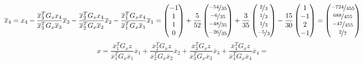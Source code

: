 \documentclass{article}
\begin{document}
$$
    \overline{x}_4 = x_4 - \frac{\overline{x}_3^TG_xx_4}{\overline{x}_3^TG_x\overline{x}_3}\overline{x}_3 - \frac{\overline{x}_2^TG_xx_4}{\overline{x}_2^TG_x\overline{x}_2}\overline{x}_2 - \frac{\overline{x}_1^TG_xx_4}{\overline{x}_1^TG_x\overline{x}_1}\overline{x}_1 = \begin{pmatrix}
        -1 \\ 1 \\ 1 \\ 0
    \end{pmatrix} + \frac{5}{52}\begin{pmatrix}
        \nicefrac{-54}{35} \\ \nicefrac{-6}{35} \\ \nicefrac{-48}{35} \\ \nicefrac{-26}{35}
    \end{pmatrix} + \frac{3}{35}\begin{pmatrix}
        \nicefrac{2}{3} \\ \nicefrac{1}{3} \\ \nicefrac{1}{3} \\ \nicefrac{-5}{3}
    \end{pmatrix} - \frac{15}{30}\begin{pmatrix}
        1 \\ -1 \\ 2 \\ -1
    \end{pmatrix} = \begin{pmatrix}
        \nicefrac{-724}{455} \\ \nicefrac{688}{455} \\ \nicefrac{-47}{455} \\ \nicefrac{2}{7}
    \end{pmatrix}
$$
$$x = \frac{\overline{x}_1^TG_xz}{\overline{x}_1^TG_x\overline{x}_1}\overline{x}_1 + \frac{\overline{x}_2^TG_xz}{\overline{x}_2^TG_x\overline{x}_2}\overline{x}_2 + \frac{\overline{x}_3^TG_xz}{\overline{x}_3^TG_x\overline{x}_3}\overline{x}_3 + \frac{\overline{x}_4^TG_xz}{\overline{x}_4^TG_x\overline{x}_4}\overline{x}_4 = $$
\end{document}
